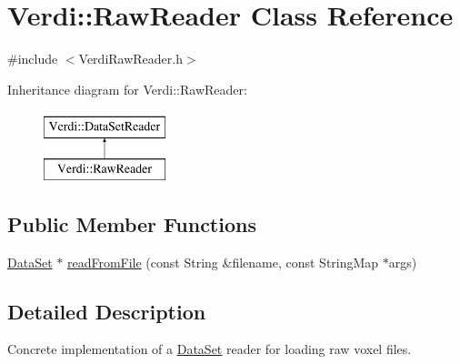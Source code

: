 \hypertarget{class_verdi_1_1_raw_reader}{\section{\-Verdi\-:\-:\-Raw\-Reader \-Class \-Reference}
\label{class_verdi_1_1_raw_reader}
}


{\ttfamily \#include $<$\-Verdi\-Raw\-Reader.\-h$>$}

\-Inheritance diagram for \-Verdi\-:\-:\-Raw\-Reader\-:\begin{figure}[H]
\begin{center}
\leavevmode
\includegraphics[height=2.000000cm]{class_verdi_1_1_raw_reader}
\end{center}
\end{figure}
\subsection*{\-Public \-Member \-Functions}
\begin{DoxyCompactItemize}
\item 
\hyperlink{class_verdi_1_1_data_set}{\-Data\-Set} $\ast$ \hyperlink{class_verdi_1_1_raw_reader_a05fbc00edb6b03a78e6a87ec1561f448}{read\-From\-File} (const \-String \&filename, const \-String\-Map $\ast$args)
\end{DoxyCompactItemize}


\subsection{\-Detailed \-Description}
\-Concrete implementation of a \hyperlink{class_verdi_1_1_data_set}{\-Data\-Set} reader for loading raw voxel files. 

